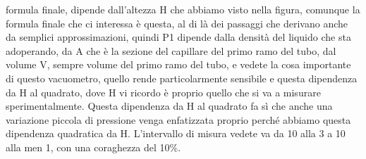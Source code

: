 formula finale, dipende dall'altezza H che abbiamo visto nella figura, comunque la formula finale che ci interessa è questa, al di là dei passaggi che derivano anche da semplici approssimazioni, quindi P1 dipende dalla densità del liquido che sta adoperando, da A che è la sezione del capillare del primo ramo del tubo, dal volume V, sempre volume del primo ramo del tubo, e vedete la cosa importante di questo vacuometro, quello rende particolarmente sensibile e questa dipendenza da H al quadrato, dove H vi ricordo è proprio quello che si va a misurare sperimentalmente. Questa dipendenza da H al quadrato fa sì che anche una variazione piccola di pressione venga enfatizzata proprio perché abbiamo questa dipendenza quadratica da H. L'intervallo di misura vedete va da 10 alla 3 a 10 alla men 1, con una coraghezza del 10\%.

